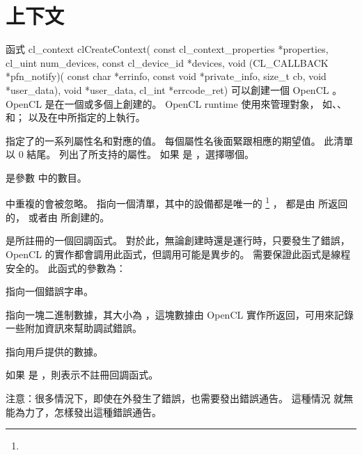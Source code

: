 \section{上下文}
函式
\startclc
cl_context clCreateContext(
		const cl_context_properties *properties,
		cl_uint num_devices,
		const cl_device_id *devices,
		void (CL_CALLBACK *pfn_notify)(
			const char *errinfo,
			const void *private_info,
			size_t cb,
			void *user_data),
		void *user_data,
		cl_int *errcode_ret)
\stopclc
可以創建一個 OpenCL 。
OpenCL 是在一個或多個上創建的。
OpenCL runtime 使用來管理對象，
如、、和；
以及在中所指定的上執行。

 指定了的一系列屬性名和對應的值。
每個屬性名後面緊跟相應的期望值。
此清單以 0 結尾。
列出了所支持的屬性。
如果  是 ，選擇哪個。

{}

 是參數  中的數目。

\startbuffer[footnoteuniquedevice]
 中重複的會被忽略。
\stopbuffer
{} 指向一個清單，其中的設備都是唯一的
\footnote{\getbuffer[footnoteuniquedevice]}
，
都是由  所返回的，
或者由  所創建的。

 是所註冊的一個回調函式。
對於此，無論創建時還是運行時，只要發生了錯誤，OpenCL 的實作都會調用此函式，但調用可能是異步的。
需要保證此函式是線程安全的。
此函式的參數為：
\startigBase
\item {} 指向一個錯誤字串。
\item {} 指向一塊二進制數據，其大小為 ，這塊數據由 OpenCL 實作所返回，可用來記錄一些附加資訊來幫助調試錯誤。
\item {} 指向用戶提供的數據。
\stopigBase

如果  是 ，則表示不註冊回調函式。

注意：很多情況下，即使在外發生了錯誤，也需要發出錯誤通告。
這種情況  就無能為力了，怎樣發出這種錯誤通告。

